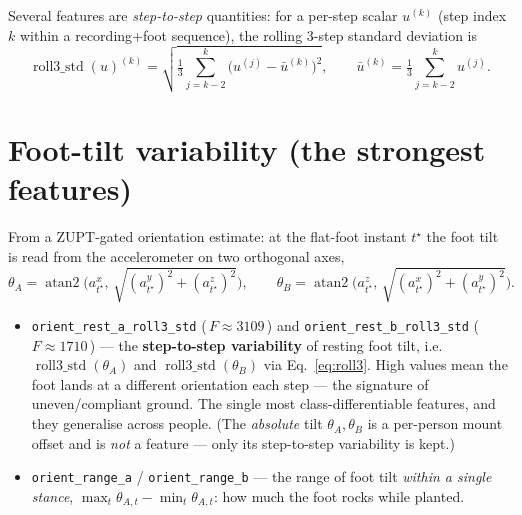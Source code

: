 \documentclass[11pt]{article}
\newcommand{\code}[1]{\texttt{#1}}
\newcommand{\Fval}[1]{{\small(\,$F\!\approx\!#1$\,)}}
\begin{document}
Several features are \emph{step-to-step} quantities: for a per-step scalar $u^{(k)}$ (step index
$k$ within a recording+foot sequence), the rolling 3-step standard deviation is
\begin{equation}
\operatorname{roll3\_std}(u)^{(k)}=\sqrt{\tfrac{1}{3}\textstyle\sum_{j=k-2}^{k}\bigl(u^{(j)}-\bar u^{(k)}\bigr)^2},
\qquad \bar u^{(k)}=\tfrac13\textstyle\sum_{j=k-2}^{k}u^{(j)}.
\label{eq:roll3}
\end{equation}

\section{Foot-tilt variability (the strongest features)}
From a ZUPT-gated orientation estimate: at the flat-foot instant $t^\star$ the foot tilt is read
from the accelerometer on two orthogonal axes,
\begin{equation}
\theta_A=\operatorname{atan2}\!\bigl(a^x_{t^\star},\,\sqrt{(a^y_{t^\star})^2+(a^z_{t^\star})^2}\bigr),
\qquad
\theta_B=\operatorname{atan2}\!\bigl(a^z_{t^\star},\,\sqrt{(a^x_{t^\star})^2+(a^y_{t^\star})^2}\bigr).
\end{equation}
\begin{itemize}
  \item \code{orient_rest_a_roll3_std} \Fval{3109} and \code{orient_rest_b_roll3_std} \Fval{1710}
  --- the \textbf{step-to-step variability} of resting foot tilt, i.e.\
  $\operatorname{roll3\_std}(\theta_A)$ and $\operatorname{roll3\_std}(\theta_B)$ via
  Eq.~\eqref{eq:roll3}. High values mean the foot lands at a different orientation each step --- the
  signature of uneven/compliant ground. The single most class-differentiable features, and they
  generalise across people. (The \emph{absolute} tilt $\theta_A,\theta_B$ is a per-person mount
  offset and is \emph{not} a feature --- only its step-to-step variability is kept.)
  \item \code{orient_range_a} / \code{orient_range_b} --- the range of foot tilt \emph{within a
  single stance}, $\max_t\theta_{A,t}-\min_t\theta_{A,t}$: how much the foot rocks while planted.
\end{itemize}
\end{document}
